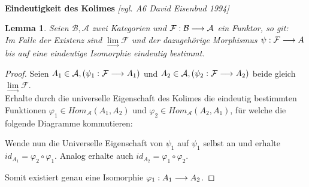 \documentclass[10pt,a4paper]{report}
\newcommand{\comment}[1]{}
\newcommand{\ModulsOfDifferenzials}{David Eisenbud 1994}
\newcounter{Aussage}[chapter]
\newtheorem{lemma}[Aussage]{Lemma}
\newcommand{\functionfront}[3]{\nolinebreak{#1:#2 \longrightarrow #3}}
\newcommand{\colimes}[0]{\lim\limits_{ \longrightarrow }}
\begin{document}
\ \\
\textbf{Eindeutigkeit des Kolimes} \textit{[vgl. A6 \ModulsOfDifferenzials]}
\begin{lemma}\comment{\label{Eindeutigkeit des Kolimes}}
Seien $\mathcal{B},\mathcal{A}$ zwei Kategorien und $\functionfront{\mathcal{F}}{\mathcal{B}}{\mathcal{A}}$ ein Funktor, so git:\\ 
Im Falle der Existenz sind $\colimes \mathcal{F}$ und der dazugehörige Morphismus $\functionfront{\psi}{\mathcal{F}}{A}$ bis auf eine eindeutige Isomorphie eindeutig bestimmt.
\end{lemma}
\begin{proof}
Seien $A_1 \in \mathcal{A}, (\functionfront{\psi_1}{\mathcal{F}}{A_1}) $ und $A_2 \in \mathcal{A} , (\functionfront{\psi_2}{\mathcal{F}}{A_2}) $ beide gleich $\colimes \mathcal{F}$.\\
Erhalte durch die universelle Eigenschaft des Kolimes die eindeutig bestimmten Funktionen $\varphi_1 \in Hom_{\mathcal{A}}(A_1,A_2)$ und $\varphi_2 \in Hom_{\mathcal{A}}(A_2,A_1)$, für welche die folgende Diagramme kommutieren:

\comment{$\functionfront{\varphi_1}{\mathcal{A}_1}{\mathcal{A}_2}$ und $\functionfront{\varphi_2}{\mathcal{A}_2}{\mathcal{A}_1}$}
\begin{center}
\end{center}
\begin{flushleft}
Wende nun die Universelle Eigenschaft von $\psi_1$ auf $\psi_1$ selbst an und erhalte $id_{A_1} = \varphi_2 \circ \varphi_1$. Analog erhalte auch $id_{A_2} = \varphi_1 \circ \varphi_2$.
\end{flushleft}
\begin{center}
\end{center}
Somit existiert genau eine Isomorphie $\functionfront{\varphi_1}{A_1}{A_2}$.
\end{proof}
\end{document}
